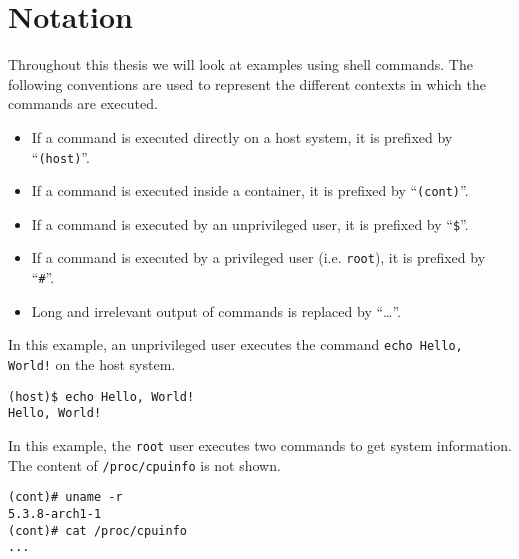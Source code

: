 \chapter{Notation}\label{chapter:notation}
Throughout this thesis we will look at examples using shell commands. The following conventions are used to represent the different contexts in which the commands are executed.

\begin{itemize}
    \item If a command is executed directly on a host system, it is prefixed by ``\lstinline{(host)}''.
    \item If a command is executed inside a container, it is prefixed by ``\lstinline{(cont)}''.
    \item If a command is executed by an unprivileged user, it is prefixed by ``\lstinline{$}''.
    \item If a command is executed by a privileged user (i.e. \lstinline{root}), it is prefixed by ``\lstinline{#}''.
    \item Long and irrelevant output of commands is replaced by ``\ldots''.
\end{itemize}

In this example, an unprivileged user executes the command \lstinline{echo Hello, World!} on the host system.
\begin{lstlisting}[caption={Shell command notation example 1}, captionpos=b]
(host)$ echo Hello, World!
Hello, World!
\end{lstlisting}

\hfill

In this example, the \lstinline{root} user executes two commands to get system information. The content of \lstinline{/proc/cpuinfo} is not shown.
\begin{lstlisting}[caption={Shell command notation example 2}, captionpos=b]
(cont)# uname -r
5.3.8-arch1-1
(cont)# cat /proc/cpuinfo
...
\end{lstlisting}
